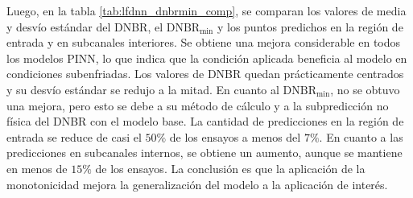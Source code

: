 




Luego, en la tabla \ref{tab:lfdnn_dnbrmin_comp}, se comparan los valores de media y desvío estándar del DNBR, el $\mathrm{DNBR}_\mathrm{min}$ y los puntos predichos en la región de entrada y en subcanales interiores. Se obtiene una mejora considerable en todos los modelos PINN, lo que indica que la condición aplicada beneficia al modelo en condiciones subenfriadas. Los valores de DNBR quedan prácticamente centrados y su desvío estándar se redujo a la mitad. En cuanto al $\mathrm{DNBR}_\mathrm{min}$, no se obtuvo una mejora, pero esto se debe a su método de cálculo y a la subpredicción no física del DNBR con el modelo base. La cantidad de predicciones en la región de entrada se reduce de casi el $50\%$ de los ensayos a menos del $7\%$. En cuanto a las predicciones en subcanales internos, se obtiene un aumento, aunque se mantiene en menos de $15\%$ de los ensayos. La conclusión es que la aplicación de la monotonicidad mejora la generalización del modelo a la aplicación de interés.

